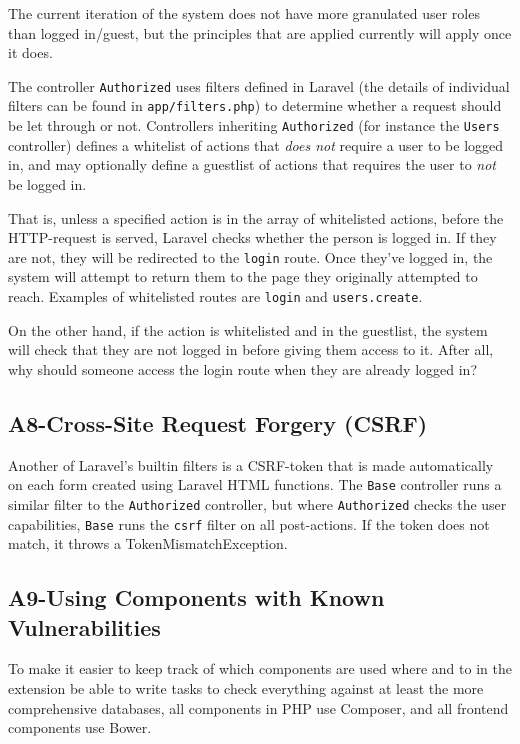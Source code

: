 The current iteration of the system does not have more granulated user roles than logged in/guest, but the principles that are applied currently will apply once it does.

The controller \texttt{Authorized} uses filters defined in Laravel (the details of individual filters can be found in \texttt{app/filters.php}) to determine whether a request should be let through or not. Controllers
inheriting \texttt{Authorized} (for instance the \texttt{Users} controller) defines a whitelist of actions that \emph{does not} require a user to be logged in, and may optionally define a guestlist of actions that requires the user to \emph{not} be logged in. 

That is, unless a specified action is in the array of whitelisted actions, before the HTTP-request is served, Laravel checks whether the person is logged in. If they are not, they will be redirected to the \texttt{login} route. Once they've logged in, the system will attempt to return them to the page they originally attempted to reach. Examples of whitelisted routes are \texttt{login} and \texttt{users.create}.

On the other hand, if the action is whitelisted and in the guestlist, the system will check that they are not logged in before giving them access to it. After all, why should someone access the login route when they are already logged in?

\subsection{A8-Cross-Site Request Forgery (CSRF)}

Another of Laravel's builtin filters is a CSRF-token that is made automatically on each form created using Laravel HTML functions. The \texttt{Base} controller runs a similar filter to the \texttt{Authorized} controller, but where \texttt{Authorized} checks the user capabilities, \texttt{Base} runs the \texttt{csrf} filter on all post-actions. If the token does not match, it throws a TokenMismatchException.

\subsection{A9-Using Components with Known Vulnerabilities}

To make it easier to keep track of which components are used where and to in the extension be able to write tasks to check everything against at least the more comprehensive databases, all components in PHP use
Composer, and all frontend components use Bower.

